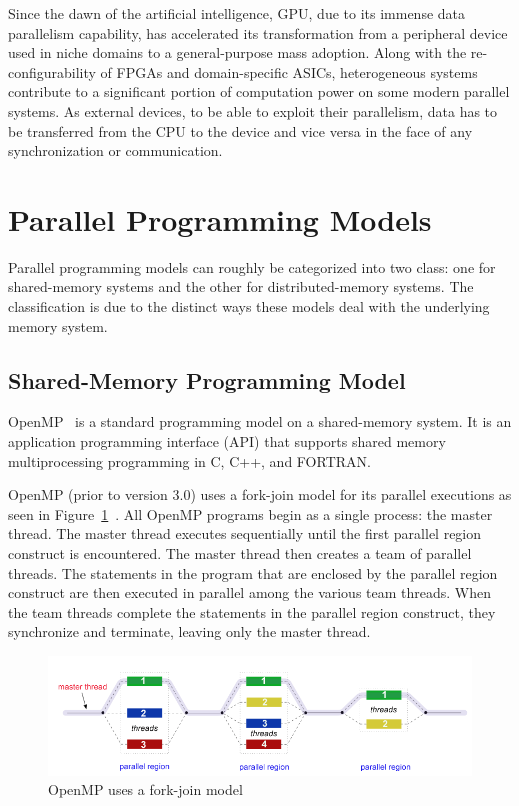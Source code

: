 Since the dawn of the artificial intelligence, GPU, due to its immense data 
parallelism capability, has accelerated its transformation from a peripheral 
device used in niche domains to a general-purpose mass adoption. Along with the 
re-configurability of FPGAs and domain-specific ASICs, heterogeneous systems 
contribute to a significant portion of computation power on some modern parallel 
systems. As external devices, to be able to exploit their parallelism, data has 
to be transferred from the CPU to the device and vice versa in the face of any 
synchronization or communication. 

\section{Parallel Programming Models}
\label{sec:ppm}
Parallel programming models can roughly be categorized into two class: one for 
shared-memory systems and the other for distributed-memory systems. The 
classification is due to the distinct ways these models deal with the underlying 
memory system.

\subsection{Shared-Memory Programming Model}
OpenMP~\cite{openmp, OpenMP4.0} is a standard programming model on a 
shared-memory system. It is an application programming interface (API) that 
supports shared memory multiprocessing programming in C, C++, and FORTRAN.

OpenMP (prior to version 3.0) uses a fork-join model for its parallel executions 
as seen in Figure~\ref{fig:fork-join}~\cite{llnl_openmp}.
All OpenMP programs begin as a single process: the master thread. The master 
thread executes sequentially until the first parallel region construct is 
encountered. The master thread then creates a team of parallel threads.
The statements in the program that are enclosed by the parallel region construct 
are then executed in parallel among the various team threads. When the team 
threads complete the statements in the parallel region construct, they 
synchronize and terminate, leaving only the master thread.
\begin{figure}[H]
    \centerline{\includegraphics[scale=0.50]{background/figs/fork_join.png}}
    \caption{OpenMP uses a fork-join model}
    \label{fig:fork-join}
\end{figure}

